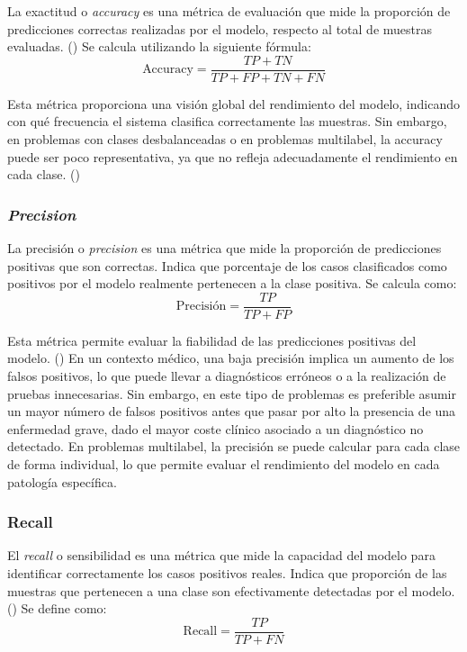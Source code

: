 \documentclass[12pt,a4paper,twoside]{book}
\begin{document}
La exactitud o \textit{accuracy} es una métrica de evaluación que mide la proporción de predicciones correctas realizadas por el modelo, respecto al total de muestras evaluadas. (\cite{evidently_accuracy_precision_recall})
Se calcula utilizando la siguiente fórmula:
\begin{equation*}
	\text{Accuracy} = \frac{TP + TN}{TP + FP + TN + FN}
\end{equation*}

Esta métrica proporciona una visión global del rendimiento del modelo, indicando con qué frecuencia el sistema clasifica correctamente las muestras. 
Sin embargo, en problemas con clases desbalanceadas o en problemas multilabel, la accuracy puede ser poco representativa, ya que no refleja adecuadamente el rendimiento en cada clase. (\cite{ibm_confusion_matrix})

\subsubsection*{\textit{Precision}}

La precisión o \textit{precision} es una métrica que mide la proporción de predicciones positivas que son correctas. 
Indica que porcentaje de los casos clasificados como positivos por el modelo realmente pertenecen a la clase positiva.
Se calcula como:
\begin{equation*}
	\text{Precisión} = \frac{TP}{TP + FP}
\end{equation*}

Esta métrica permite evaluar la fiabilidad de las predicciones positivas del modelo. (\cite{evidently_accuracy_precision_recall})
En un contexto médico, una baja precisión implica un aumento de los falsos positivos, lo que puede llevar a diagnósticos erróneos o a la realización de pruebas innecesarias.
Sin embargo, en este tipo de problemas es preferible asumir un mayor número de falsos positivos antes que pasar por alto la presencia de una enfermedad grave, dado el mayor coste clínico asociado a un diagnóstico no detectado.
En problemas multilabel, la precisión se puede calcular para cada clase de forma individual, lo que permite evaluar el rendimiento del modelo en cada patología específica.

\subsubsection*{Recall}

El \textit{recall} o sensibilidad es una métrica que mide la capacidad del modelo para identificar correctamente los casos positivos reales. Indica que proporción de las muestras que pertenecen a una clase son efectivamente detectadas por el modelo. (\cite{evidently_accuracy_precision_recall})
Se define como:
\begin{equation*}
	\text{Recall} = \frac{TP}{TP + FN}	
\end{equation*}
\end{document}
